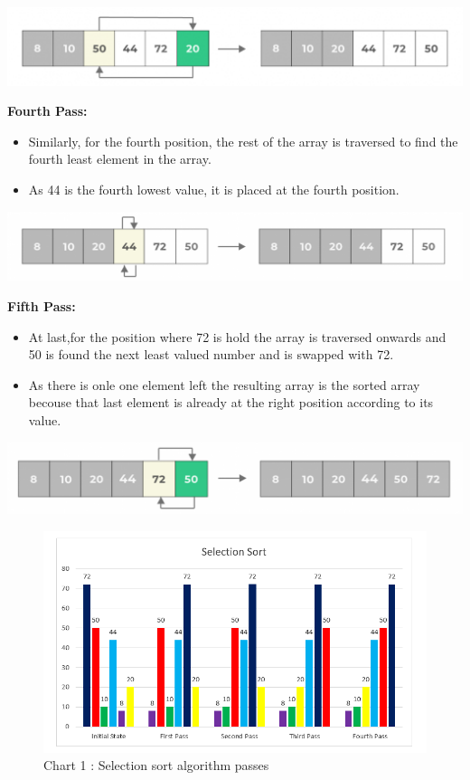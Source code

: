 \documentclass[a4paper,12pt,twocolumn]{article}
\begin{document}
\begin{center}
    \includegraphics[width=0.9\linewidth]{pass-3.png}
    \label{pass-3}
\end{center}
\textbf{Fourth Pass:}
\begin{itemize}
    \item Similarly, for the fourth position, the rest of the array is traversed to find the fourth least element in the array.
    \item As 44 is the fourth lowest value, it is placed at the fourth position.
\end{itemize}
\begin{center}
    \includegraphics[width=0.9\linewidth]{pass-4.png}
    \label{pass-4}
\end{center}
\textbf{Fifth Pass:}
\begin{itemize}
    \item At last,for the position where 72 is hold the array is traversed onwards and 50 is found the next least valued number and is swapped with 72.
    \item As there is onle one element left the resulting array is the sorted array becouse that last element is already at the right position according to its value.
\end{itemize}
\begin{center}
    \includegraphics[width=0.6\linewidth]{pass-5.png}
    \label{pass-5}
\end{center}

\begin{figure}[H]
    \centering
    \includegraphics[width=\linewidth]{chart1.png}
    \captionsetup{font=small, textfont=it}
    \caption*{Chart 1 : Selection sort algorithm passes}
    \label{fig:chart1}
\end{figure}
\end{document}
